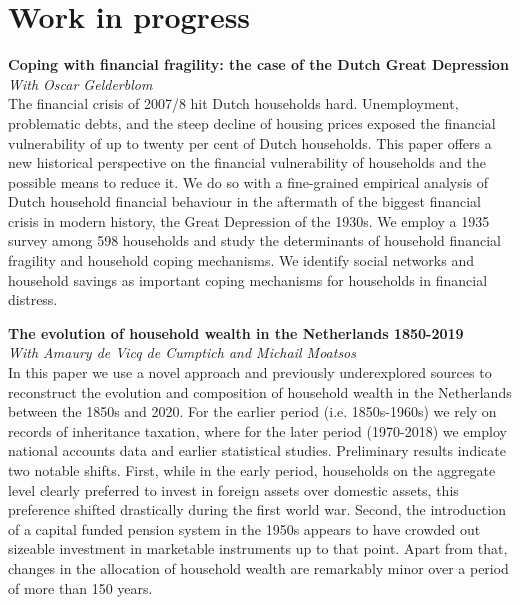 \documentclass[9pt]{article}
\begin{document}
\vspace{-5pt}\section*{Work in progress}\vspace{-7pt}	
\noindent \textbf{Coping with financial fragility: the case of the Dutch Great Depression} \\
\noindent\textit{With Oscar Gelderblom} \\
The financial crisis of 2007/8 hit Dutch households hard. Unemployment, problematic debts, and the steep decline of housing prices exposed the financial vulnerability of up to twenty per cent of Dutch households. This paper offers a new historical perspective on the financial vulnerability of households and the possible means to reduce it. We do so with a fine-grained empirical analysis of Dutch household financial behaviour in the aftermath of the biggest financial crisis in modern history, the Great Depression of the 1930s. We employ a 1935 survey among 598 households and study the determinants of household financial fragility and household coping mechanisms. We identify social networks and household savings as important coping mechanisms for households in financial distress.\\ \vspace{-5pt}	

\noindent \textbf{The evolution of household wealth in the Netherlands 1850-2019} \\
\noindent\textit{With Amaury de Vicq de Cumptich and Michail Moatsos} \\
In this paper we use a novel approach and previously underexplored sources to reconstruct the evolution and composition of household wealth in the Netherlands between the 1850s and 2020. For the earlier period (i.e. 1850s-1960s) we rely on records of inheritance taxation, where for the later period (1970-2018) we employ national accounts data and earlier statistical studies. 
Preliminary results indicate two notable shifts. First, while in the early period, households on the aggregate level clearly preferred to invest in foreign assets over domestic assets, this preference shifted drastically during the first world war. Second, the introduction of a capital funded pension system in the 1950s appears to have crowded out sizeable investment in marketable instruments up to that point. Apart from that, changes in the allocation of household wealth are remarkably minor over a period of more than 150 years. \vspace{-5pt}	
\end{document}
